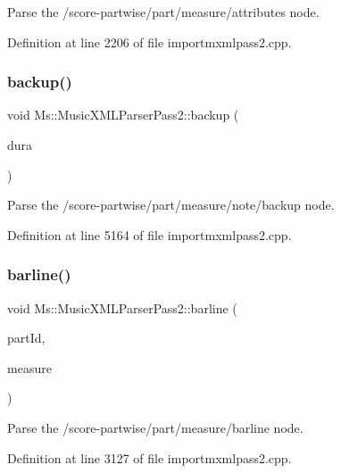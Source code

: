 Parse the /score-\/partwise/part/measure/attributes node. 

Definition at line 2206 of file importmxmlpass2.\+cpp.

\mbox{\label{class_ms_1_1_music_x_m_l_parser_pass2_af1845a2177dfef1e7c41f9b24542e7d4}} 
\subsubsection{\texorpdfstring{backup()}{backup()}}
{\footnotesize\ttfamily void Ms\+::\+Music\+X\+M\+L\+Parser\+Pass2\+::backup (\begin{DoxyParamCaption}\item[{\hyperlink{class_ms_1_1_fraction}{Fraction} \&}]{dura }\end{DoxyParamCaption})}

Parse the /score-\/partwise/part/measure/note/backup node. 

Definition at line 5164 of file importmxmlpass2.\+cpp.

\mbox{\label{class_ms_1_1_music_x_m_l_parser_pass2_a90c030127af7225c2e0f3b51166cc0b8}} 
\subsubsection{\texorpdfstring{barline()}{barline()}}
{\footnotesize\ttfamily void Ms\+::\+Music\+X\+M\+L\+Parser\+Pass2\+::barline (\begin{DoxyParamCaption}\item[{const Q\+String \&}]{part\+Id,  }\item[{\hyperlink{class_ms_1_1_measure}{Measure} $\ast$}]{measure }\end{DoxyParamCaption})}

Parse the /score-\/partwise/part/measure/barline node. 

Definition at line 3127 of file importmxmlpass2.\+cpp.

\mbox{\label{class_ms_1_1_music_x_m_l_parser_pass2_a6d5d7103dc2875d9f749f22491452f63}} 
